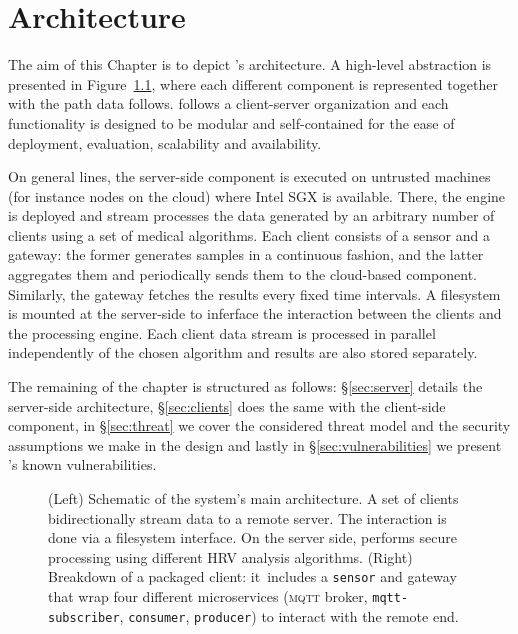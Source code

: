 \chapter{Architecture} \label{chap:architecture}

The aim of this Chapter is to depict \projName's architecture.
A high-level abstraction is presented in Figure~\ref{fig:system-architecture}, where each different component is represented together with the path data follows.
\projName follows a client-server organization and each functionality is designed to be modular and self-contained for the ease of deployment, evaluation, scalability and availability.

On general lines, the server-side component is executed on untrusted machines (for instance nodes on the cloud) where Intel SGX is available.
There, the \sgxspark engine is deployed and stream processes the data generated by an arbitrary number of clients using a set of medical algorithms.
Each client consists of a sensor and a gateway: the former generates samples in a continuous fashion, and the latter aggregates them and periodically sends them to the cloud-based component.
Similarly, the gateway fetches the results every fixed time intervals.
A filesystem is mounted at the server-side to inferface the interaction between the clients and the processing engine.
Each client data stream is processed in parallel independently of the chosen algorithm and results are also stored separately.

The remaining of the chapter is structured as follows: \S\ref{sec:server} details the server-side architecture, \S\ref{sec:clients} does the same with the client-side component, in \S\ref{sec:threat} we cover the considered threat model and the security assumptions we make in the design and lastly in \S\ref{sec:vulnerabilities} we present \projName's known vulnerabilities.

\begin{figure}[h!]
    \centering
    
    \caption{(Left) Schematic of the system's main architecture. A set of clients bidirectionally stream data to a remote server. The interaction is done via a filesystem interface. On the server side, \sgxspark performs secure processing using different HRV analysis algorithms. (Right) Breakdown of a packaged client: it includes a \texttt{sensor} and gateway that wrap four different microservices (\textsc{mqtt} broker, \texttt{mqtt-subscriber}, \texttt{consumer}, \texttt{producer}) to interact with the remote end. \label{fig:system-architecture}}
\end{figure}

